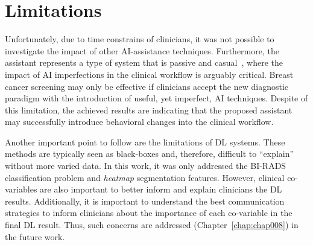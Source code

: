 \section{Limitations}
\label{sec:sec007005}

Unfortunately, due to time constrains of clinicians, it was not possible to investigate the impact of other \ac{AI}-assistance techniques.
Furthermore, the assistant represents a type of system that is passive and casual~\cite{Kocielnik:2019:YAI:3290605.3300641}, where the impact of \ac{AI} imperfections in the clinical workflow is arguably critical.
Breast cancer screening may only be effective if clinicians accept the new diagnostic paradigm with the introduction of useful, yet imperfect, \ac{AI} techniques.
Despite of this limitation, the achieved results are indicating that the proposed assistant may successfully introduce behavioral changes into the clinical workflow.

Another important point to follow are the limitations of \ac{DL} systems.
These methods are typically seen as black-boxes \cite{litjens2017survey} and, therefore, difficult to ``explain'' without more varied data.
In this work, it was only addressed the \ac{BI-RADS} classification problem and {\it heatmap} segmentation features.
However, clinical co-variables are also important to better inform and explain clinicians the \ac{DL} results.
Additionally, it is important to understand the best communication strategies to inform clinicians about the importance of each co-variable in the final \ac{DL} result.
Thus, such concerns are addressed (Chapter~\ref{chap:chap008}) in the future work.